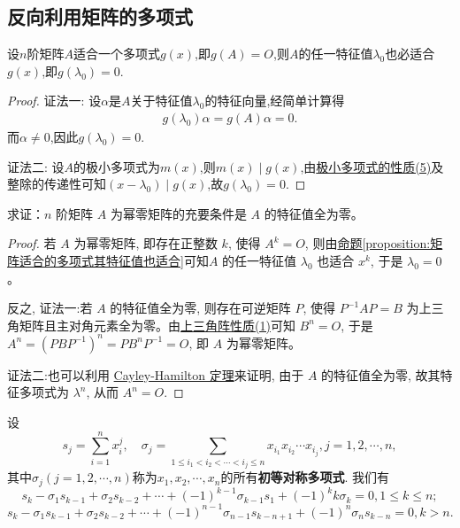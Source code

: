 \documentclass[../../main.tex]{subfiles}%
\begin{document}
\subsection{反向利用矩阵的多项式}

\begin{proposition}\label{proposition:矩阵适合的多项式其特征值也适合}
设$n$阶矩阵$A$适合一个多项式$g(x)$,即$g(A) = O$,则$A$的任一特征值$\lambda_0$也必适合$g(x)$,即$g(\lambda_0) = 0$.
\end{proposition}
\begin{proof}

{\color{blue}证法一:}
设$\alpha$是$A$关于特征值$\lambda_0$的特征向量,经简单计算得
\begin{align*}
g(\lambda_0) \alpha = g(A) \alpha = 0.
\end{align*}
而$\alpha \neq 0$,因此$g(\lambda_0) = 0$.

{\color{blue}证法二:}
设$A$的极小多项式为$m(x)$,则$m(x)\mid g(x)$,由\hyperref[proposition:极小多项式的性质]{极小多项式的性质(5)}及整除的传递性可知$(x-\lambda_0)\mid g(x)$,故$g(\lambda_0)=0.$
\end{proof}

\begin{proposition}[幂零矩阵关于特征值的充要条件]\label{proposition:幂零矩阵关于特征值的充要条件}
求证：$n$ 阶矩阵 $A$ 为幂零矩阵的充要条件是 $A$ 的特征值全为零。
\end{proposition}
\begin{proof}
若 $A$ 为幂零矩阵, 即存在正整数 $k$, 使得 $A^k = O$, 则由\hyperref[proposition:矩阵适合的多项式其特征值也适合]{命题\ref{proposition:矩阵适合的多项式其特征值也适合}}可知$A$ 的任一特征值 $\lambda_0$ 也适合 $x^k$, 于是 $\lambda_0 = 0$。

反之,
{\color{blue}证法一:}若 $A$ 的特征值全为零, 则存在可逆矩阵 $P$, 使得 $P^{-1}AP = B$ 为上三角矩阵且主对角元素全为零。由\hyperref[proposition:上三角阵性质]{上三角阵性质(1)}可知 $B^n = O$, 于是 $A^n = (PBP^{-1})^n = PB^nP^{-1} = O$, 即 $A$ 为幂零矩阵。

{\color{blue}证法二:}也可以利用 \hyperref[theorem:Cayley-Hamilton定理]{Cayley-Hamilton 定理}来证明, 由于 $A$ 的特征值全为零, 故其特征多项式为 $\lambda^n$, 从而 $A^n = O$.
\end{proof}

\begin{theorem}[Netwon公式]\label{theorem:Netwon公式}
设
\[
s_j = \sum_{i=1}^n x_i^j, \quad \sigma_j = \sum_{1 \leqslant i_1 < i_2 < \cdots < i_j \leqslant n} x_{i_1}x_{i_2} \cdots x_{i_j}, j = 1, 2, \cdots, n,
\]
其中$\sigma_j(j=1,2,\cdots,n)$称为$x_1,x_2,\cdots,x_n$的所有\textbf{初等对称多项式}.
我们有
\[
s_k - \sigma_1 s_{k - 1} + \sigma_2 s_{k - 2} + \cdots + (-1)^{k - 1} \sigma_{k - 1} s_1 + (-1)^k k \sigma_k = 0, 1 \leqslant k \leqslant n;
\]
\[
s_k - \sigma_1 s_{k - 1} + \sigma_2 s_{k - 2} + \cdots + (-1)^{n - 1} \sigma_{n - 1} s_{k - n + 1} + (-1)^n \sigma_n s_{k - n} = 0, k > n.
\]
\end{theorem}
\end{document}
